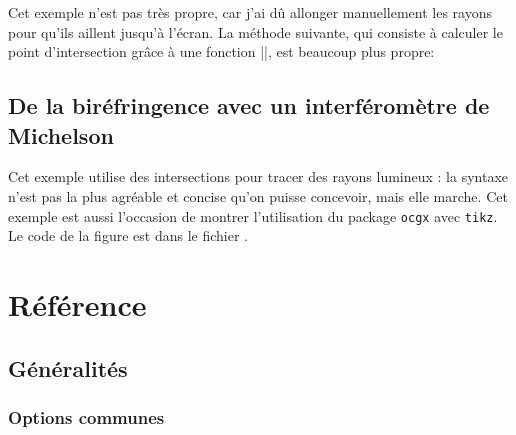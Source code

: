 \documentclass[a4paper]{ltxdoc}
\begin{document}
  Cet exemple n'est pas très propre, car j'ai dû allonger manuellement les rayons pour qu'ils aillent jusqu'à l'écran. La méthode suivante, qui consiste à calculer le point d'intersection grâce à une fonction |\toVerticalProjection|, est beaucoup plus propre:

\begin{codeexample}[]
\end{codeexample}

\subsection{De la biréfringence avec un interféromètre de Michelson}



Cet exemple utilise des intersections pour tracer des rayons lumineux : la syntaxe n'est pas la plus agréable et concise qu'on puisse concevoir, mais elle marche. 
Cet exemple est aussi l'occasion de montrer l'utilisation du package \texttt{ocgx} avec \texttt{tikz}.
Le code de la figure est dans le fichier .


\section{Référence}

\subsection{Généralités}

\subsubsection{Options communes}
\end{document}
